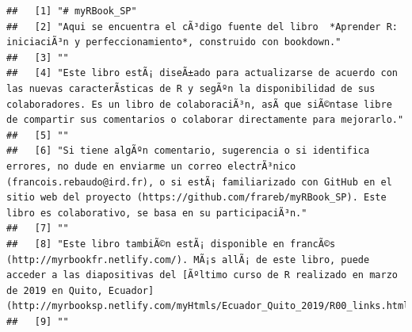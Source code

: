 \documentclass[
]{book}
\begin{document}
\begin{verbatim}
##   [1] "# myRBook_SP"                                                                                                                                                                                                                                                                                            
##   [2] "Aqui se encuentra el cÃ³digo fuente del libro  *Aprender R: iniciaciÃ³n y perfeccionamiento*, construido con bookdown."                                                                                                                                                                                  
##   [3] ""                                                                                                                                                                                                                                                                                                        
##   [4] "Este libro estÃ¡ diseÃ±ado para actualizarse de acuerdo con las nuevas caracterÃ­sticas de R y segÃºn la disponibilidad de sus colaboradores. Es un libro de colaboraciÃ³n, asÃ­ que siÃ©ntase libre de compartir sus comentarios o colaborar directamente para mejorarlo."                              
##   [5] ""                                                                                                                                                                                                                                                                                                        
##   [6] "Si tiene algÃºn comentario, sugerencia o si identifica errores, no dude en enviarme un correo electrÃ³nico (francois.rebaudo@ird.fr), o si estÃ¡ familiarizado con GitHub en el sitio web del proyecto (https://github.com/frareb/myRBook_SP). Este libro es colaborativo, se basa en su participaciÃ³n."
##   [7] ""                                                                                                                                                                                                                                                                                                        
##   [8] "Este libro tambiÃ©n estÃ¡ disponible en francÃ©s (http://myrbookfr.netlify.com/). MÃ¡s allÃ¡ de este libro, puede acceder a las diapositivas del [Ãºltimo curso de R realizado en marzo de 2019 en Quito, Ecuador](http://myrbooksp.netlify.com/myHtmls/Ecuador_Quito_2019/R00_links.html)."             
##   [9] ""                                                                                                                                                                                                                                                                                                        

\end{verbatim}
\end{document}
